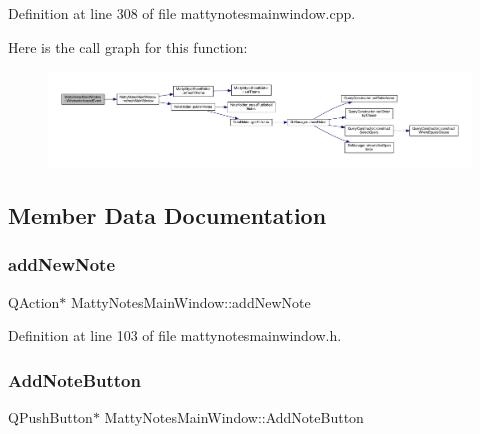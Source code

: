 Definition at line 308 of file mattynotesmainwindow.\+cpp.

Here is the call graph for this function\+:
\nopagebreak
\begin{figure}[H]
\begin{center}
\leavevmode
\includegraphics[width=350pt]{classMattyNotesMainWindow_acb9472c3ba8430272c29864b5d046ea3_cgraph}
\end{center}
\end{figure}


\subsection{Member Data Documentation}
\hypertarget{classMattyNotesMainWindow_abae8d206a434f0aceb166e2989afbcbc}{}\label{classMattyNotesMainWindow_abae8d206a434f0aceb166e2989afbcbc} 
\subsubsection{\texorpdfstring{add\+New\+Note}{addNewNote}}
{\footnotesize\ttfamily Q\+Action$\ast$ Matty\+Notes\+Main\+Window\+::add\+New\+Note\hspace{0.3cm}{\ttfamily [private]}}



Definition at line 103 of file mattynotesmainwindow.\+h.

\hypertarget{classMattyNotesMainWindow_aeb4fd769ffeac425a43abc16708b6dc1}{}\label{classMattyNotesMainWindow_aeb4fd769ffeac425a43abc16708b6dc1} 
\subsubsection{\texorpdfstring{Add\+Note\+Button}{AddNoteButton}}
{\footnotesize\ttfamily Q\+Push\+Button$\ast$ Matty\+Notes\+Main\+Window\+::\+Add\+Note\+Button\hspace{0.3cm}{\ttfamily [private]}}



